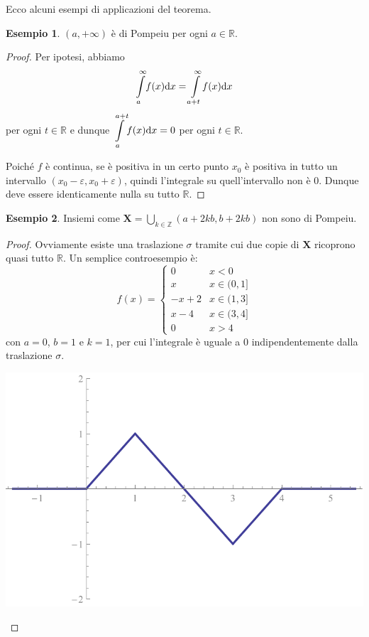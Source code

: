 \documentclass[12pt]{article}
\newcommand\rea{\mathbb R}
\newcommand\ins[1]{\mathbf #1}
\newcommand\pom{di Pompeiu}
\newcommand\inte[3]{\int\limits_{#1}^{#2}\!#3(x)\text dx}
\theoremstyle{definition}
\newtheorem{esem}{Esempio}
\begin{document}
Ecco alcuni esempi di applicazioni del teorema.
\begin{esem}\label{esem:semiretta}
$(a,+\infty)$ è \pom{} per ogni $a\in\rea$.
\end{esem}
\begin{proof}
Per ipotesi, abbiamo \[\displaystyle\inte a\infty f=\inte{a+t}\infty f\] per ogni $t\in\rea$
e dunque $\displaystyle\inte a{a+t}f=0$ per ogni $t\in\rea$.


Poiché $f$ è continua, se è positiva in un certo punto $x_0$
è positiva in tutto un intervallo $(x_0-\varepsilon,x_0+\varepsilon)$, quindi
l'integrale su quell'intervallo non è $0$.
Dunque deve essere identicamente nulla su tutto $\rea$.%
\end{proof}

\begin{esem}Insiemi come $\displaystyle\ins X=\bigcup_{k\in\mathbb Z}(a+2kb,b+2kb)$ non sono \pom{}.
\end{esem}
\begin{proof}Ovviamente esiste una traslazione $\sigma$ tramite cui due copie di $\ins X$ ricoprono quasi tutto $\rea$.
Un semplice controesempio è:
\begin{equation*}
f(x)=\left\{\begin{matrix}
0 & x<0 \\ 
x & x\in(0,1]\\
-x+2 & x\in(1,3]\\
x-4 & x\in(3,4]\\
0 & x>4
\end{matrix}\right.
\end{equation*}
con $a=0$, $b=1$ e $k=1$, per cui l'integrale è uguale a $0$ indipendentemente dalla traslazione $\sigma$.
\begin{center}
\includegraphics*[scale=0.8]{ex1.pdf}
\end{center}
\end{proof}
\end{document}
